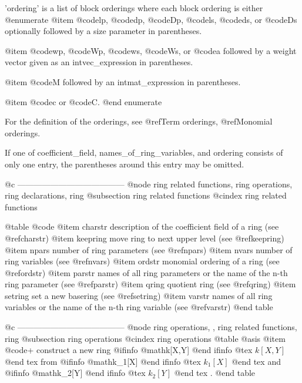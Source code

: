 {{{{{{'ordering' is a list of block orderings where each block ordering is either
@enumerate
@item
@code{lp}, @code{dp}, @code{Dp}, @code{ls}, @code{ds}, or @code{Ds}
optionally followed by a size parameter in parentheses.

@item
@code{wp}, @code{Wp}, @code{ws}, @code{Ws}, or @code{a} followed by a
weight vector given as an intvec_expression in parentheses.

@item
@code{M} followed by an intmat_expression in parentheses.

@item
@code{c} or @code{C}.
@end enumerate

For the definition of the orderings, see @ref{Term orderings},
@ref{Monomial orderings}.

If one of coefficient_field, names_of_ring_variables, and ordering
consists of only one entry, the parentheses around this entry may be
omitted.

@c ---------------------------------------
@node ring related functions, ring operations, ring declarations, ring
@subsection ring related functions
@cindex ring related functions

@table @code
@item charstr
description of the coefficient field of a ring (see @ref{charstr})
@item keepring
move ring to next upper level (see @ref{keepring})
@item npars
number of ring parameters (see @ref{npars})
@item nvars
number of ring variables (see @ref{nvars})
@item ordstr
monomial ordering of a ring (see @ref{ordstr})
@item parstr
names of all ring parameters or the
name of the n-th ring parameter (see @ref{parstr})
@item qring
quotient ring (see @ref{qring})
@item setring
set a new basering (see @ref{setring})
@item varstr
names of all ring variables or the
name of the n-th ring variable (see @ref{varstr})
@end table

@c ---------------------------------------
@node ring operations, , ring related functions, ring
@subsection ring operations
@cindex ring operations
@table @asis
@item @code{+}
construct a new ring 
@ifinfo
@math{k[X,Y]}
@end ifinfo
@tex
$k[X,Y]$
@end tex
 from 
@ifinfo
@math{k_1[X]}
@end ifinfo
@tex
$k_1[X]$
@end tex
  and 
@ifinfo
@math{k_2[Y]}
@end ifinfo
@tex
$k_2[Y]$
@end tex
.
@end table

}}}}}}
